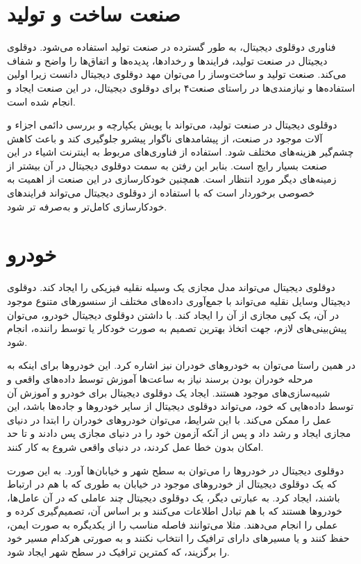 \section{صنعت ساخت و تولید}
فناوری دوقلوی دیجیتال، به طور گسترده در صنعت تولید استفاده می‌شود. دوقلو‌ی دیجیتال در صنعت تولید، فرایند‌ها و رخداد‌ها، پدیده‌ها و اتفاق‌ها را واضح و شفاف می‌کند. صنعت تولید و ساخت‌وساز را می‌توان مهد دوقلوی دیجیتال دانست زیرا اولین استفاده‌ها و نیازمندی‌ها در راستای صنعت۴ برای دوقلوی دیجیتال، در این صنعت ایجاد و انجام شده‌ است.

دوقلوی دیجیتال در صنعت تولید، می‌تواند با پویش یکپارچه و بررسی دائمی اجزاء و آلات موجود در صنعت، از پیشامد‌های ناگوار پیشرو جلوگیری کند و باعث کاهش چشم‌گیر هزینه‌های مختلف شود. استفاده از فناوری‌های مربوط به اینترنت اشیاء در این صنعت بسیار رایج است. بنابر این رفتن به سمت دوقلوی دیجیتال در آن بیشتر از زمینه‌های دیگر مورد انتظار است. همچنین خودکار‌سازی در این صنعت از اهمیت به خصوصی برخوردار است که با استفاده از دوقلوی دیجیتال می‌تواند فرایند‌های خودکار‌سازی کامل‌تر و به‌صرفه تر شود.


\section{خودرو}
دوقلوی دیجیتال می‌تواند مدل مجازی یک وسیله نقلیه فیزیکی را ایجاد کند. دوقلوی دیجیتال وسایل نقلیه می‌تواند با جمع‌آوری داده‌های مختلف از سنسور‌های متنوع موجود در آن، یک کپی مجازی از آن را ایجاد کند. با داشتن دوقلوی دیجیتال خودرو، می‌توان پیش‌بینی‌های لازم، جهت اتخاذ بهترین تصمیم به صورت خودکار یا توسط راننده، انجام شود. 

در همین راستا می‌توان به خودرو‌های خودران نیز اشاره کرد. این خودرو‌ها برای اینکه به مرحله خودران بودن برسند نیاز به ساعت‌ها آموزش توسط داده‌های واقعی و شبیه‌سازی‌های موجود هستند. ایجاد یک دوقلوی دیجیتال برای خودرو و آموزش آن توسط داده‌هایی که خود، می‌تواند دوقلوی دیجیتال از سایر خودرو‌ها و جاده‌ها باشد، این عمل را ممکن می‌کند. با این شرایط، می‌توان خودرو‌های خودران را ابتدا در دنیای مجازی ایجاد و رشد داد و پس از آنکه آزمون خود را در دنیای مجازی پس دادند و تا حد امکان بدون خطا عمل کردند، در دنیای واقعی شروع به کار کنند.

دوقلوی دیجیتال در خودرو‌ها را می‌توان به سطح شهر و خیابان‌ها آورد. به این صورت که یک دوقلوی دیجیتال از خودرو‌های موجود در خیابان به طوری که با هم در ارتباط باشند، ایجاد کرد. به عبارتی دیگر، یک دوقلوی دیجیتال چند عاملی که در آن عامل‌ها، خودرو‌ها هستند که با هم تبادل اطلاعات می‌کنند و بر اساس آن،‌ تصمیم‌گیری کرده و عملی را انجام می‌دهند. مثلا می‌توانند فاصله مناسب را از یکدیگره به صورت ایمن، حفظ کنند و یا مسیر‌های دارای ترافیک را انتخاب نکنند و به صورتی هرکدام مسیر خود را برگزیند، که کمترین ترافیک در سطح شهر ایجاد شود.

